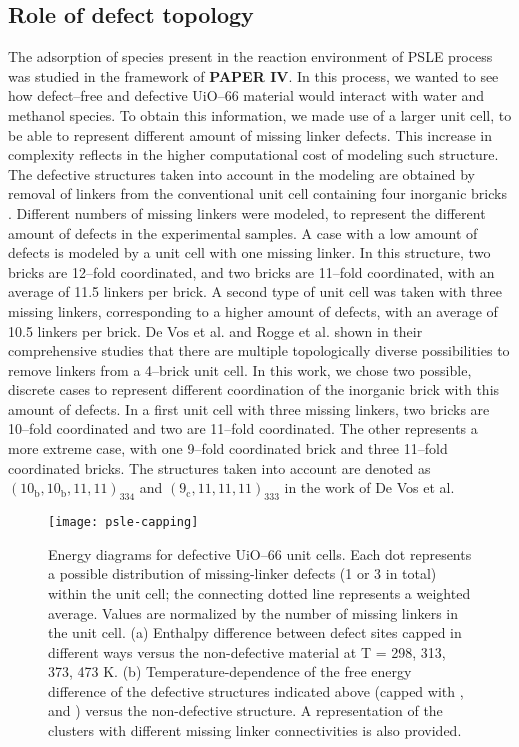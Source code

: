 \subsection*{Role of defect topology}
The adsorption of species present in the reaction environment of PSLE process was studied in the framework of \textbf{PAPER IV}. In this process, we wanted to see how defect--free and defective UiO--66 material would interact with water and methanol species. To obtain this information, we made use of a larger unit cell, to be able to represent different amount of missing linker defects. This increase in complexity reflects in the higher computational cost of modeling such structure. The defective structures taken into account in the modeling are obtained by removal of linkers from the conventional unit cell containing four inorganic  bricks \cite{cavka2008new}. Different numbers of missing linkers were modeled, to represent the different amount of defects in the experimental samples. A case with a low amount of defects is modeled by a unit cell with one missing linker. In this structure, two bricks are 12--fold coordinated, and two bricks are 11--fold coordinated, with an average of 11.5 linkers per brick. A second type of unit cell was taken with three missing linkers, corresponding to a higher amount of defects, with an average of 10.5 linkers per brick. De Vos et al. and Rogge et al.\cite{devos2017missing, rogge2016thermodynamic} shown in their comprehensive studies that there are multiple topologically diverse possibilities to remove linkers from a 4--brick unit cell. In this work, we chose two possible, discrete cases to represent different coordination of the inorganic brick with this amount of defects. In a first unit cell with three missing linkers, two bricks are 10--fold coordinated and two are 11--fold coordinated. The other represents a more extreme case, with one 9--fold coordinated brick and three 11--fold coordinated bricks. The structures taken into account are denoted as $\mathrm{(10_{b}, 10_{b}, 11, 11)_{334}}$ and $\mathrm{(9_{c}, 11, 11, 11)_{333}}$ in the work of De Vos et al. 
%
\begin{figure}[!htbp]
	\centering
	\texttt{[image: psle-capping]}
	\caption{Energy diagrams for defective UiO--66 unit cells. Each dot represents a possible distribution of missing-linker defects (1 or 3 in total) within the unit cell; the connecting dotted line represents a weighted average. Values are normalized by the number of missing linkers in the unit cell. (a) Enthalpy difference between defect sites capped in different ways versus the non-defective material at T = 298, 313, 373, 473 K. (b) Temperature-dependence of the free energy difference of the defective structures indicated above (capped with ,  and ) versus the non-defective structure. A representation of the clusters with different missing linker connectivities is also provided.}
	\label{fig:psle-capping}
\end{figure}

